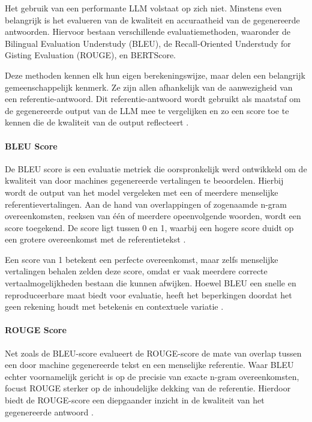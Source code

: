     Het gebruik van een performante LLM volstaat op zich niet. Minstens even belangrijk is het evalueren van de kwaliteit en accuraatheid van de gegenereerde antwoorden. Hiervoor bestaan verschillende evaluatiemethoden, waaronder de Bilingual Evaluation Understudy (BLEU), de Recall-Oriented Understudy for Gisting Evaluation (ROUGE), en BERTScore.  
    
    Deze methoden kennen elk hun eigen berekeningswijze, maar delen een belangrijk gemeenschappelijk kenmerk. Ze zijn allen afhankelijk van de aanwezigheid van een referentie-antwoord. Dit referentie-antwoord wordt gebruikt als maatstaf om de gegenereerde output van de LLM mee te vergelijken en zo een score toe te kennen die de kwaliteit van de output reflecteert \autocite{microsoft2024evaluation}.
    
    \paragraph{BLEU Score}
    
    De BLEU score is een evaluatie metriek die oorspronkelijk werd ontwikkeld om de kwaliteit van door machines gegenereerde vertalingen te beoordelen. Hierbij wordt de output van het model vergeleken met een of meerdere menselijke referentievertalingen. Aan de hand van overlappingen of zogenaamde n-gram overeenkomsten, reeksen van één of meerdere opeenvolgende woorden, wordt een score toegekend. De score ligt tussen 0 en 1, waarbij een hogere score duidt op een grotere overeenkomst met de referentietekst \autocite{papineni-etal-2002-bleu}.
    
    Een score van 1 betekent een perfecte overeenkomst, maar zelfs menselijke vertalingen behalen zelden deze score, omdat er vaak meerdere correcte vertaalmogelijkheden bestaan die kunnen afwijken. Hoewel BLEU een snelle en reproduceerbare maat biedt voor evaluatie, heeft het beperkingen doordat het geen rekening houdt met betekenis en contextuele variatie \autocite{papineni-etal-2002-bleu}.
    
    \paragraph{ROUGE Score}
    
    Net zoals de BLEU-score evalueert de ROUGE-score de mate van overlap tussen een door machine gegenereerde tekst en een menselijke referentie. Waar BLEU echter voornamelijk gericht is op de precisie van exacte n-gram overeenkomsten, focust ROUGE sterker op de inhoudelijke dekking van de referentie. Hierdoor biedt de ROUGE-score een diepgaander inzicht in de kwaliteit van het gegenereerde antwoord \autocite{ganesan2018rouge20updatedimproved}.
    
